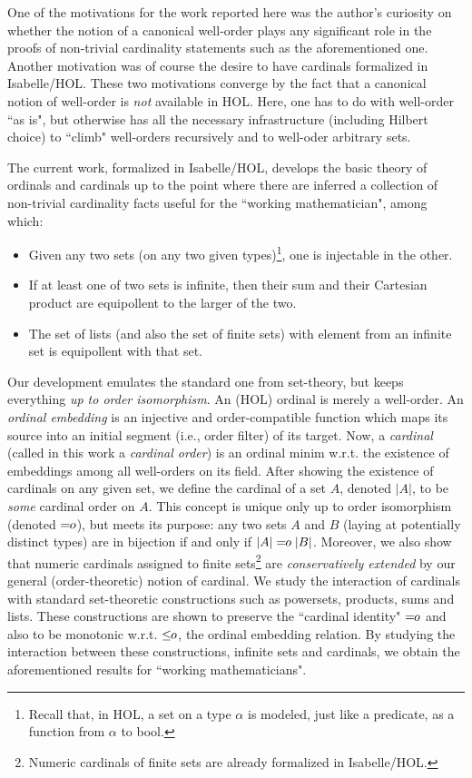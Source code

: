 One of the motivations for the work reported here was the author's curiosity on 
whether the notion of a canonical 
well-order plays any significant role in the proofs of non-trivial 
cardinality statements such as the aforementioned one.  Another motivation was of course the 
desire to have cardinals formalized in Isabelle/HOL.  These two motivations  
converge by the fact that a canonical notion of well-order is {\em not} available in HOL.  
Here, one has to do with well-order ``as is", but otherwise has all the necessary infrastructure 
(including Hilbert choice) to ``climb" well-orders recursively and to well-oder arbitrary sets.  

The current work, formalized in Isabelle/HOL, develops the basic theory of ordinals and cardinals 
up to the point where there are inferred a collection of non-trivial cardinality facts useful 
for the ``working mathematician", among which: 
\begin{itemize}
\item Given any two sets (on any two given types)\footnote{Recall that, in HOL, a set 
on a type $\alpha$ is modeled, just like a predicate, as a function from $\alpha$ to \textsf{bool}.}, 
one is injectable in the other.  
\item If at least one of two sets is infinite, then their sum and their Cartesian product are equipollent 
to the larger of the two. 
\item The set of lists (and also the set of finite sets) with element from an 
infinite set is equipollent with that set.  
\end{itemize}


Our development emulates the standard one from set-theory, but keeps everything 
{\em up to order isomorphism}.  
An (HOL) ordinal is merely a well-order.  An {\em ordinal embedding} is an 
injective and order-compatible function which maps its source into an initial segment 
(i.e., order filter) of its target.  Now, a {\em cardinal} (called in this work a {\em cardinal order}) 
is an ordinal minim w.r.t. the existence of embeddings among all 
well-orders on its field.  After showing the existence of cardinals on any given set, 
we define the cardinal of a set $A$, denoted $|A|$, to be {\em some} cardinal order 
on $A$.  This concept is unique only up to order isomorphism (denoted $\mbox{$=\!\!o$}$), but meets 
its purpose: any two sets $A$ and $B$ (laying at potentially distinct types) 
are in bijection if and only if $|A|\;\mbox{$=\!\!o$}\;|B|$. Moreover, we also show that numeric cardinals 
assigned to finite sets\footnote{Numeric cardinals of finite sets are already formalized in 
Isabelle/HOL.} 
are {\em conservatively extended} by our general (order-theoretic) notion of 
cardinal. We study the interaction of cardinals with standard set-theoretic 
constructions such as powersets, products, sums and lists.  These constructions are shown 
to preserve the ``cardinal identity" $\mbox{$=\!\!o$}$ and also to be monotonic w.r.t. $\mbox{$\leq\!\!o$}$, the ordinal 
embedding relation.  By studying the interaction between these constructions, infinite sets and 
cardinals, we obtain the 
aforementioned results for ``working mathematicians".  

